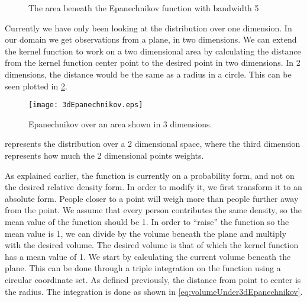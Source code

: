 \begin{figure}
\centering
{}
\caption{The area beneath the Epanechnikov function with bandwidth 5}
\label{fig:1dEpanechnikovDistributionWithHPlot}
\end{figure}

Currently we have only been looking at the distribution over one dimension. In our domain we get observations from a plane, in two dimensions. We can extend the kernel function to work on a two dimensional area by calculating the distance from the kernel function center point to the desired point in two dimensions. In 2 dimensions, the distance would be the same as a radius in a circle. This can be seen plotted in \cref{fig:3dEpanechnikov}.

\begin{figure}[htbp]
\centering
    \texttt{[image: 3dEpanechnikov.eps]}
    \caption{Epanechnikov over an area shown in 3 dimensions.}
    \label{fig:3dEpanechnikov}
\end{figure}

 represents the distribution over a 2 dimensional space, where the third dimension represents how much the 2 dimensional points weights.

As explained earlier, the function is currently on a probability form, and not on the desired relative density form. In order to modify it, we first transform it to an absolute form. People closer to a point will weigh more than people further away from the point. We assume that every person contributes the same density, so the mean value of the function should be 1. In order to \enquote{raise} the function so the mean value is 1, we can divide by the volume beneath the plane and multiply with the desired volume. The desired volume is that of which the kernel function has a mean value of 1. We start by calculating the current volume beneath the plane. This can be done through a triple integration on the function using a circular coordinate set. As defined previously, the distance from point to center is the radius. The integration is done as shown in \cref{eq:volumeUnder3dEpanechnikov}.

